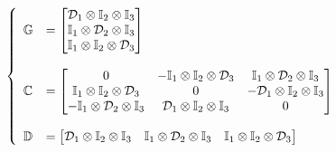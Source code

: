 \begin{align}
  \left\{ 
  \begin{array}{ll}
  \mathbb{G} &= 
    \begin{bmatrix}
      \mathcal{D}_1 \otimes \mathbb{I}_2 \otimes \mathbb{I}_3
      \\
      \mathbb{I}_1 \otimes \mathcal{D}_2 \otimes \mathbb{I}_3 
      \\
      \mathbb{I}_1 \otimes \mathbb{I}_2 \otimes \mathcal{D}_3
    \end{bmatrix}
  \\
  \\
  \mathbb{C} &= 
  \begin{bmatrix}
    0    &    - \mathbb{I}_1 \otimes \mathbb{I}_2 \otimes \mathcal{D}_3  &  \mathbb{I}_1 \otimes \mathcal{D}_2 \otimes \mathbb{I}_3 
    \\
    \mathbb{I}_1 \otimes \mathbb{I}_2 \otimes \mathcal{D}_3   &    0   &   - \mathcal{D}_1 \otimes \mathbb{I}_2 \otimes \mathbb{I}_3 
    \\
    - \mathbb{I}_1 \otimes \mathcal{D}_2 \otimes \mathbb{I}_3  & \mathcal{D}_1 \otimes \mathbb{I}_2 \otimes \mathbb{I}_3 & 0 
  \end{bmatrix} 
  \\
  \\
  \mathbb{D} &= 
    \begin{bmatrix}
      \mathcal{D}_1 \otimes \mathbb{I}_2 \otimes \mathbb{I}_3
      & 
      \mathbb{I}_1 \otimes \mathcal{D}_2 \otimes \mathbb{I}_3 
      &
      \mathbb{I}_1 \otimes \mathbb{I}_2 \otimes \mathcal{D}_3
    \end{bmatrix}
  \end{array} \right.
  \label{eq:discrete-derivatives-3d}
\end{align}
%

